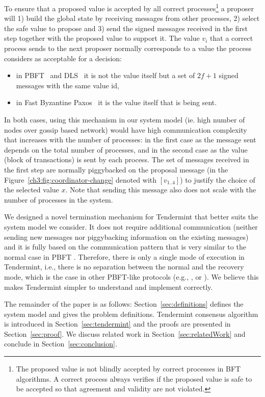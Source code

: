 To ensure that a proposed value is accepted by all correct
processes\footnote{The proposed value is not blindly accepted by correct
processes in BFT algorithms. A correct process always verifies if the proposed
value is safe to be accepted so that agreement and validity are not violated.}
a proposer will 1) build the global state by receiving messages from other
processes, 2) select the safe value to propose and 3) send the signed messages
received in the first step together with the proposed value to support it. The
value $v_i$ that a correct process sends to the next proposer normally
corresponds to a value the process considers as acceptable for a decision: 

\begin{itemize} \item in PBFT~\cite{CL99:osdi} and DLS~\cite{DLS88:jacm} it is
        not the value itself but a set of $2f+1$ signed messages with the same
    value id, \item in Fast Byzantine Paxos~\cite{MA06:tdsc} it is the value
        itself that is being sent.  \end{itemize}

In both cases, using this mechanism in our system model (ie. high
number of nodes over gossip based network) would have high communication
complexity that increases with the number of processes: in the first case as
the message sent depends on the total number of processes, and in the second
case as the value (block of transactions) is sent by each process. The set of
messages received in the first step are normally piggybacked on the proposal
message (in the Figure~\ref{ch3:fig:coordinator-change} denoted with
$[v_{1..4}]$) to justify the choice of the selected value $x$. Note that
sending this message also does not scale with the number of processes in the
system.   

We designed a novel termination mechanism for Tendermint that better suits the
system model we consider. It does not require additional communication (neither
sending new messages nor piggybacking information on the existing messages) and
it is fully based on the communication pattern that is very similar to the
normal case in PBFT \cite{CL99:osdi}. Therefore, there is only a single mode of
execution in Tendermint, i.e., there is no separation between the normal and
the recovery mode, which is the case in other PBFT-like protocols (e.g.,
\cite{CL99:osdi}, \cite{Ver09:spinning} or \cite{Cle09:aardvark}). We believe
this makes Tendermint simpler to understand and implement correctly.  

The remainder of the paper is as follows: Section~\ref{sec:definitions} defines
the system model and gives the problem definitions. Tendermint
consensus algorithm is introduced in Section~\ref{sec:tendermint} and the
proofs are presented in Section~\ref{sec:proof}. We discuss related work in
Section~\ref{sec:relatedWork} and conclude in Section~\ref{sec:conclusion}.  
